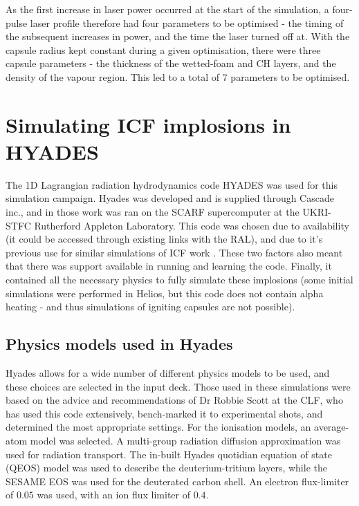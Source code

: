 As the first increase in laser power occurred at the start of the simulation, a four-pulse laser profile therefore had four parameters to be optimised - the timing of the subsequent increases in power, and the time the laser turned off at. With the capsule radius kept constant during a given optimisation, there were three capsule parameters - the thickness of the wetted-foam and CH layers, and the density of the vapour region. This led to a total of 7 parameters to be optimised.

\section{Simulating ICF implosions in HYADES}

The 1D Lagrangian radiation hydrodynamics code HYADES was used for this simulation campaign.  Hyades was developed and is supplied through Cascade inc., and in those work was ran on the SCARF supercomputer at the UKRI-STFC Rutherford Appleton Laboratory. This code was chosen due to availability (it could be accessed through existing links with the RAL), and due to it's previous use for similar simulations of ICF work \cite{Hatfield2019}. These two factors also meant that there was support available in running and learning the code. Finally, it contained all the necessary physics to fully simulate these implosions (some initial simulations were performed in Helios, but this code does not contain alpha heating - and thus simulations of igniting capsules are not possible).

\subsection{Physics models used in Hyades}

Hyades allows for a wide number of different physics models to be used, and these choices are selected in the input deck. Those used in these simulations were based on the advice and recommendations of Dr Robbie Scott at the CLF, who has used this code extensively, bench-marked it to experimental shots, and determined the most appropriate settings. For the ionisation models, an average-atom model was selected. A multi-group radiation diffusion approximation was used for radiation transport. The in-built Hyades quotidian equation of state (QEOS) model was used to describe the deuterium-tritium layers, while the SESAME EOS was used for the deuterated carbon shell. An electron flux-limiter of $0.05$ was used, with an ion flux limiter of $0.4$. 

